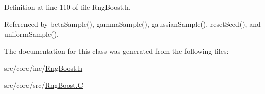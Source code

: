 Definition at line 110 of file Rng\-Boost.\-h.



Referenced by beta\-Sample(), gamma\-Sample(), gaussian\-Sample(), reset\-Seed(), and uniform\-Sample().



The documentation for this class was generated from the following files\-:\begin{DoxyCompactItemize}
\item 
src/core/inc/\hyperlink{_rng_boost_8h}{Rng\-Boost.\-h}\item 
src/core/src/\hyperlink{_rng_boost_8_c}{Rng\-Boost.\-C}\end{DoxyCompactItemize}
